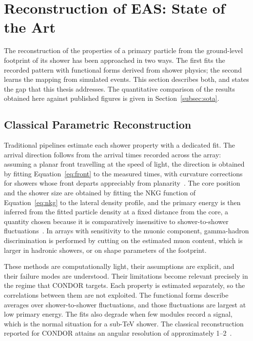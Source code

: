 \section{Reconstruction of EAS: State of the Art}
\label{sec:related_work}

The reconstruction of the properties of a primary particle from the ground-level footprint of its shower has been approached in two ways. The first fits the recorded pattern with functional forms derived from shower physics; the second learns the mapping from simulated events. This section describes both, and states the gap that this thesis addresses. The quantitative comparison of the results obtained here against published figures is given in Section~\ref{subsec:sota}.

\subsection{Classical Parametric Reconstruction}

Traditional pipelines estimate each shower property with a dedicated fit. The arrival direction follows from the arrival times recorded across the array: assuming a planar front travelling at the speed of light, the direction is obtained by fitting Equation~\ref{eq:front} to the measured times, with curvature corrections for showers whose front departs appreciably from planarity~. The core position and the shower size are obtained by fitting the NKG function of Equation~\ref{eq:nkg} to the lateral density profile, and the primary energy is then inferred from the fitted particle density at a fixed distance from the core, a quantity chosen because it is comparatively insensitive to shower-to-shower fluctuations~. In arrays with sensitivity to the muonic component, gamma-hadron discrimination is performed by cutting on the estimated muon content, which is larger in hadronic showers, or on shape parameters of the footprint.

These methods are computationally light, their assumptions are explicit, and their failure modes are understood. Their limitations become relevant precisely in the regime that CONDOR targets. Each property is estimated separately, so the correlations between them are not exploited. The functional forms describe averages over shower-to-shower fluctuations, and those fluctuations are largest at low primary energy. The fits also degrade when few modules record a signal, which is the normal situation for a sub-TeV shower. The classical reconstruction reported for CONDOR attains an angular resolution of approximately 1--2\degree~.

